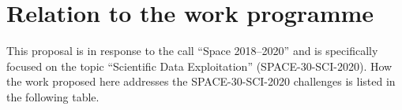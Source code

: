 %



\section{Relation to the work programme}
\label{sec:relation-to-work-programme}

This proposal is in response to the call ``Space 2018--2020'' and is specifically focused on the topic ``Scientific Data Exploitation'' (SPACE-30-SCI-2020). How the work proposed here addresses the SPACE-30-SCI-2020 challenges is listed in the following table.

